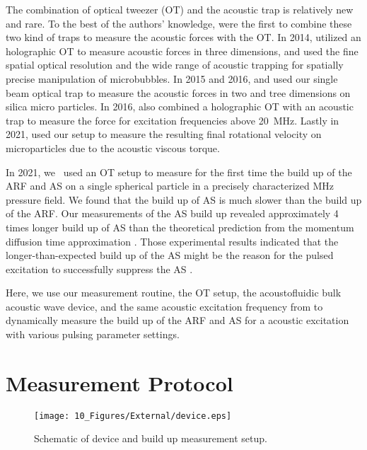 The combination of optical tweezer (OT) and the acoustic trap is relatively new 
and rare. To the best of the authors' knowledge,  were 
\citeyear{Thalhammer2011} the first to combine these two kind of traps to 
measure the acoustic forces with the OT. In 2014,  
utilized an holographic OT to measure acoustic forces in three dimensions, and 
 used the fine spatial optical resolution and the wide range of 
acoustic trapping for spatially precise manipulation of microbubbles. In 2015 
and 2016,  and  used our single beam 
optical trap to measure the acoustic forces in two and tree dimensions on 
silica micro particles. In 2016,  also combined a 
holographic OT with an acoustic trap to measure the force for excitation 
frequencies above \SI{20}{\mega\hertz}. Lastly in 2021,  
used our setup to measure the resulting final rotational velocity on 
microparticles due to the acoustic viscous torque.

In 2021, we~\cite{Goering2021} used an OT setup to measure for the first time 
the build up of the ARF and AS on a single spherical particle in a precisely 
characterized \si{\mega\hertz} pressure field. We found that the build up of AS 
is much slower than the build up of the ARF. Our measurements of the AS build 
up revealed approximately 4 times longer build up of AS than the theoretical 
prediction from the momentum diffusion time approximation 
\cite{Muller2015,Goering2021}. Those experimental results indicated that the 
longer-than-expected build up of the AS might be the reason for the pulsed 
excitation to successfully suppress the AS \cite{Hoyos2013,Castro2016}.



Here, we use our measurement routine, the OT setup, the acoustofluidic bulk 
acoustic wave device, and the same acoustic excitation frequency from 
\cite{Goering2021} to dynamically measure the build up of the ARF and AS for a 
acoustic excitation with various pulsing parameter settings.

\section{Measurement Protocol}

\begin{figure}[tbp]
  \centering
  \texttt{[image: 10\_Figures/External/device.eps]}
  \caption{Schematic of device and build up measurement 
  setup.}\label{fig:device}
\end{figure}


